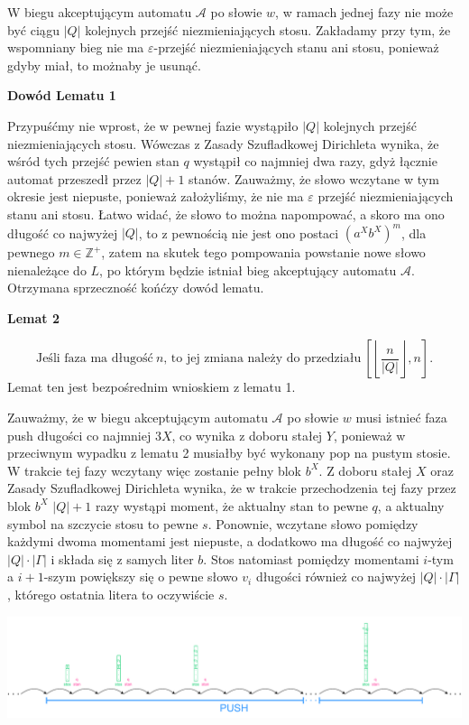 \documentclass[12pt]{article}
\begin{document}
	W biegu akceptującym automatu \(\mathcal{A}\) po słowie \(w\), w ramach
	jednej fazy nie może być ciągu \(\left| Q \right|\) kolejnych przejść
	niezmieniających stosu. Zakładamy przy tym, że wspomniany bieg nie ma
	\(\varepsilon\)-przejść niezmieniających stanu ani stosu, ponieważ gdyby
	miał, to możnaby je usunąć.
	
	\medskip
	
	\textbf{Dowód Lematu 1}
	
	Przypuśćmy nie wprost, że w pewnej fazie wystąpiło \(\left| Q \right|\)
	kolejnych przejść niezmieniających stosu. Wówczas z Zasady Szufladkowej
	Dirichleta wynika, że wśród tych przejść pewien stan \(q\) wystąpił co
	najmniej dwa razy, gdyż łącznie automat przeszedł przez \(\left| Q \right| +
	1\) stanów. Zauważmy, że słowo wczytane w tym okresie jest niepuste,
	ponieważ założyliśmy, że nie ma \(\varepsilon\) przejść niezmieniających
	stanu ani stosu. Łatwo widać, że słowo to można napompować, a skoro ma ono
	długość co najwyżej \(\left| Q \right|\), to z pewnością nie jest ono
	postaci \(\left( a^{X} b^{X} \right) ^ m\), dla pewnego \(m \in
	\mathbb{Z}^{+}\), zatem na skutek tego pompowania powstanie nowe słowo
	nienależące do \(L\), po którym będzie istniał bieg akceptujący automatu
	\(\mathcal{A}\). Otrzymana sprzeczność końćzy dowód lematu.
	
	\medskip
	
	\textbf{Lemat 2}
	
	\[ \text{Jeśli faza ma długość} \ n
	\text{, to jej zmiana należy do przedziału} \ \left[ \left\lfloor
	\frac{n}{\left| Q \right|} \right\rfloor, n \right] \text{.} \]
	Lemat ten jest bezpośrednim wnioskiem z lematu 1.
	
	\medskip
	
	Zauważmy, że w biegu akceptującym automatu \(\mathcal{A}\) po słowie \(w\)
	musi istnieć faza push długości co najmniej \(3X\), co wynika z doboru
	stałej \(Y\), ponieważ w przeciwnym wypadku z lematu 2 musiałby być wykonany
	pop na pustym stosie. W trakcie tej fazy wczytany więc zostanie pełny blok
	\(b^{X}\). Z doboru stałej \(X\) oraz Zasady Szufladkowej Dirichleta wynika,
	że w trakcie przechodzenia tej fazy przez blok \(b^{X}\) \(\left| Q \right|
	+ 1\) razy wystąpi moment, że aktualny stan to pewne \(q\), a aktualny
	symbol na szczycie stosu to pewne \(s\). Ponownie, wczytane słowo pomiędzy
	każdymi dwoma momentami jest niepuste, a dodatkowo ma długość co najwyżej
	\(\left| Q \right| \cdot \left| \Gamma \right|\) i składa się z samych liter
	\(b\). Stos natomiast pomiędzy momentami \(i\)-tym a \(i + 1\)-szym
	powiększy się o pewne słowo \(v_{i}\) długości również co najwyżej \(\left|
	Q \right| \cdot \left| \Gamma \right|\), którego ostatnia litera to
	oczywiście \(s\).
	\begin{center}
		\includegraphics[width = 0.9 \textwidth]{./image-1.pdf}
	\end{center}
	
\end{document}
